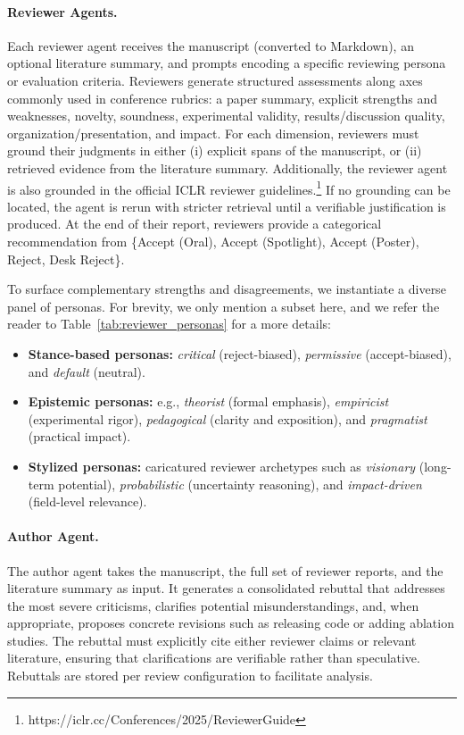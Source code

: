 \documentclass{article} %
\newcommand{\shrink}[1][0.5]{\vspace{-#1\baselineskip}}
\begin{document}
\paragraph{Reviewer Agents.}\shrink[.75]
Each reviewer agent receives the manuscript (converted to Markdown), an optional literature summary, and prompts encoding a specific reviewing persona or evaluation criteria. Reviewers generate structured assessments along axes commonly used in conference rubrics: a paper summary, explicit strengths and weaknesses, novelty, soundness, experimental validity, results/discussion quality, organization/presentation, and impact. For each dimension, reviewers must ground their judgments in either (i) explicit spans of the manuscript, or (ii) retrieved evidence from the literature summary. Additionally, the reviewer agent is also grounded in the official ICLR reviewer guidelines.\footnote{https://iclr.cc/Conferences/2025/ReviewerGuide} If no grounding can be located, the agent is rerun with stricter retrieval until a verifiable justification is produced. At the end of their report, reviewers provide a categorical recommendation from \{Accept (Oral), Accept (Spotlight), Accept (Poster), Reject, Desk Reject\}.

To surface complementary strengths and disagreements, we instantiate a diverse panel of personas. For brevity, we only mention a subset here, and we refer the reader to Table~\ref{tab:reviewer_personas} for a more details:  
\begin{itemize}
    \item \textbf{Stance-based personas:} \textit{critical} (reject-biased), \textit{permissive} (accept-biased), and \textit{default} (neutral).  
    \item \textbf{Epistemic personas:} e.g., \textit{theorist} (formal emphasis), \textit{empiricist} (experimental rigor), \textit{pedagogical} (clarity and exposition), and \textit{pragmatist} (practical impact).  
    \item \textbf{Stylized personas:} caricatured reviewer archetypes such as \textit{visionary} (long-term potential), \textit{probabilistic} (uncertainty reasoning), and \textit{impact-driven} (field-level relevance).  
\end{itemize}

\paragraph{Author Agent.}\shrink[.75]
The author agent takes the manuscript, the full set of reviewer reports, and the literature summary as input. It generates a consolidated rebuttal that addresses the most severe criticisms, clarifies potential misunderstandings, and, when appropriate, proposes concrete revisions such as releasing code or adding ablation studies. The rebuttal must explicitly cite either reviewer claims or relevant literature, ensuring that clarifications are verifiable rather than speculative. Rebuttals are stored per review configuration to facilitate analysis.
\end{document}
